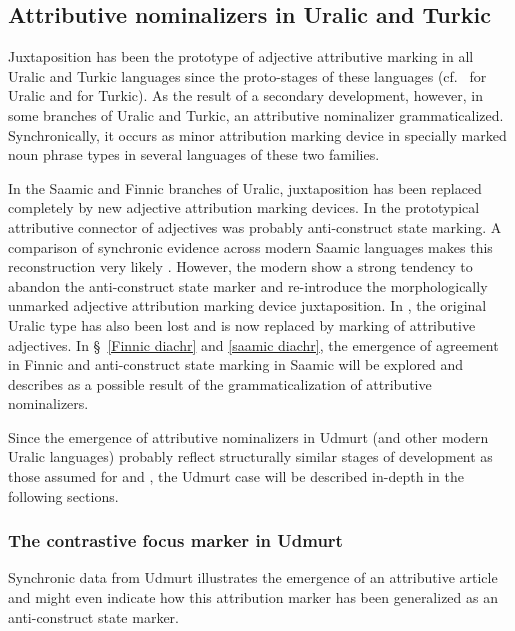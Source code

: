 \subsection{Attributive nominalizers in Uralic and Turkic}\label{uralic-turkic diachr}
Juxtaposition has been the prototype of adjective attributive marking in all Uralic and Turkic languages since the proto-stages of these languages (cf.~\citealt[80–81]{decsy1990} for Uralic and \citealt[75–76]{decsy1998} for Turkic). As the result of a secondary development, however, in some branches of Uralic and Turkic, an attributive nominalizer grammaticalized. Synchronically, it occurs as minor attribution marking device in specially marked noun phrase types in several languages of these two families.%

In the Saamic and Finnic branches of Uralic, juxtaposition has been replaced completely by new adjective attribution marking devices. In  the prototypical attributive connector of adjectives was probably anti\hyp{}construct state marking. A comparison of synchronic evidence across modern Saamic languages makes this reconstruction very likely \citep{riesler2006b}. However, the modern  show a strong tendency to abandon the anti\hyp{}construct state marker and re-introduce the morphologically unmarked adjective attribution marking device juxtaposition. In , the original Uralic type has also been lost and is now replaced by  marking of attributive adjectives. In \S~\ref{Finnic diachr} and \ref{saamic diachr}, the emergence of agreement in Finnic and anti\hyp{}construct state marking in Saamic will be explored and describes as a possible result of the grammaticalization of attributive nominalizers.

Since the emergence of attributive nominalizers in Udmurt (and other modern Uralic languages) probably reflect structurally similar stages of development as those assumed for  and , the Udmurt case will be described in-depth in the following sections.

\subsubsection{The contrastive focus marker in Udmurt} \label{udmurt diachr}
Synchronic data from Udmurt illustrates the emergence of an attributive article and might even indicate how this attribution marker has been generalized as an anti\hyp{}construct state marker. 

